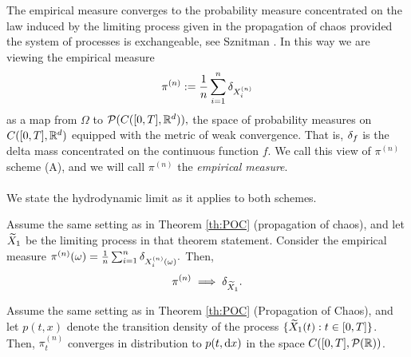 The empirical measure converges to the probability measure concentrated on the law induced by the limiting process given in the propagation of chaos provided the system of processes is exchangeable, see Sznitman \cite{Sznitman1}. In this way we are viewing the empirical measure
\[
\pi^{(n)} := \frac{1}{n}\sum_{i = 1}^n\delta_{X_i^{(n)}}
\]
as a map from $\Omega$ to $\mathcal{P}(C([0, T], \mathbb{R}^d)),$ the space of probability measures on $C([0, T], \mathbb{R}^d)$
equipped with the metric of weak convergence. That is, $\delta_{f}$ is the delta mass concentrated on the continuous function $f.$ We call this view of $\pi^{(n)}$ scheme (A), and we will call $\pi^{(n)}$ the \emph{empirical measure}. \\
\\
We state the hydrodynamic limit as it applies to both schemes.

\begin{theorem}[HL, Scheme (A)]
	Assume the same setting as in Theorem \ref{th:POC} (propagation of chaos), and let $\widetilde{X}_1$ be the limiting process in that theorem statement. Consider the empirical measure
	$\pi^{(n)}(\omega) = \frac{1}{n}\sum_{i = 1}^n\delta_{X_i^{(n)}(\omega)}.$ Then,
	\[
	\pi^{(n)} \implies \delta_{\widetilde{X}_1}.
	\]
\end{theorem}

\begin{theorem}[HL, Scheme (B)]
	Assume the same setting as in Theorem \ref{th:POC} (Propagation of Chaos), and let $p(t, x)$ denote the transition density of the process $\{\widetilde{X}_1(t) : t \in [0, T]\}$. Then, $\pi_t^{(n)}$ converges in distribution to $p(t, \mathrm{d} x)$ in the space $C([0, T], \mathcal{P}(\mathbb{R}))$.
\end{theorem}



